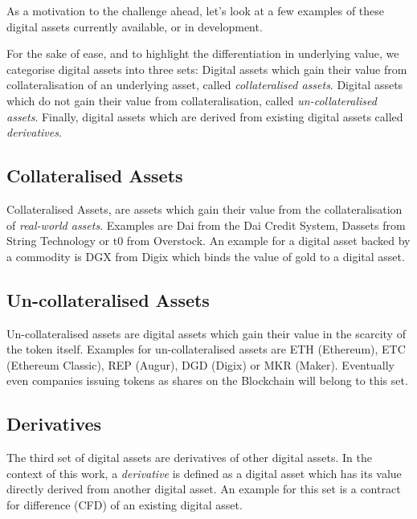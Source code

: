 \documentclass[9pt,oneside]{amsart}
\theoremstyle{plain}
\begin{document}
\begin{multicols}{2}
    As a motivation to the challenge ahead, let's look at a few examples of these digital assets currently available, or in development.
    
    For the sake of ease, and to highlight the differentiation in underlying value, we categorise digital assets into three sets: Digital assets which gain their value from collateralisation of an underlying asset, called \textit{collateralised assets}. Digital assets which do not gain their value from collateralisation, called \textit{un-collateralised assets}. Finally, digital assets which are derived from existing digital assets called \textit{derivatives}.
    
    \subsection{Collateralised Assets}\label{sub:altcoins}
    
    Collateralised Assets, are assets which gain their value from the collateralisation of \textit{real-world assets}.
    Examples are Dai from the Dai Credit System\cite{makerdao}, Dassets\cite{string:technology} from String Technology or t0\cite{t0} from Overstock. An example for a digital asset backed by a commodity is DGX from Digix\cite{digix} which binds the value of gold to a digital asset.
    
    
    \subsection{Un-collateralised Assets}\label{sub:coins}
    
    Un-collateralised assets are digital assets which gain their value in the scarcity of the token itself.
    Examples for un-collateralised assets are ETH (Ethereum\cite{ethereum}), ETC (Ethereum Classic\cite{ethereumclassic}), REP (Augur\cite{augur}), DGD (Digix\cite{digix}) or MKR (Maker\cite{makerdao}). Eventually even companies issuing tokens as shares on the Blockchain will belong to this set.
    
    \subsection{Derivatives}\label{sub:derivatives}
    
    The third set of digital assets are derivatives of other digital assets. In the context of this work, a \textit{derivative} is defined as a digital asset which has its value directly derived from another digital asset.
    An example for this set is a contract for difference (CFD) of an existing digital asset.
    

\end{multicols}
\end{document}
